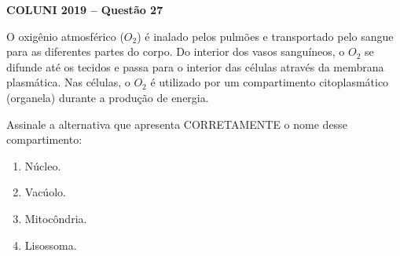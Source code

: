 \textbf{COLUNI 2019 -- Questão 27}\par\medskip O oxigênio atmosférico ($O_2$) é inalado pelos pulmões e transportado pelo sangue para as diferentes partes do corpo. Do interior dos vasos sanguíneos, o $O_2$ se difunde até os tecidos e passa para o interior das células através da membrana plasmática. Nas células, o $O_2$ é utilizado por um compartimento citoplasmático (organela) durante a produção de energia.

\par

Assinale a alternativa que apresenta CORRETAMENTE o nome desse compartimento:

\par

\begin{enumerate}
\item Núcleo.
\item Vacúolo.
\item Mitocôndria.
\item Lisossoma.
\end{enumerate}
